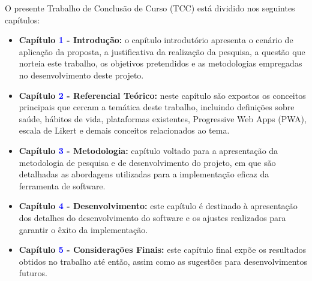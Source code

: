 O presente Trabalho de Conclusão de Curso (TCC) está dividido nos seguintes capítulos:

\begin{itemize}

\item \textbf{Capítulo \textcolor{blue}{1} - Introdução:} o capítulo introdutório apresenta o cenário de aplicação da proposta, a justificativa da realização da pesquisa, a questão que norteia este trabalho, os objetivos pretendidos e as metodologias empregadas no desenvolvimento deste projeto.

\item \textbf{Capítulo \textcolor{blue}{2} - Referencial Teórico:} neste capítulo são expostos os conceitos principais que cercam a temática deste trabalho, incluindo definições sobre saúde, hábitos de vida, plataformas existentes, Progressive Web Apps (PWA), escala de Likert e demais conceitos relacionados ao tema.

\item \textbf{Capítulo \textcolor{blue}{3} - Metodologia:} capítulo voltado para a apresentação da metodologia de pesquisa e de desenvolvimento do projeto, em que são detalhadas as abordagens utilizadas para a implementação eficaz da ferramenta de software.

\item \textbf{Capítulo \textcolor{blue}{4} - Desenvolvimento:} este capítulo é destinado à apresentação dos detalhes do desenvolvimento do software e os ajustes realizados para garantir o êxito da implementação. 

\item \textbf{Capítulo \textcolor{blue}{5} - Considerações Finais:} este capítulo final expõe os resultados obtidos no trabalho até então, assim como as sugestões para desenvolvimentos futuros. 

\end{itemize}

